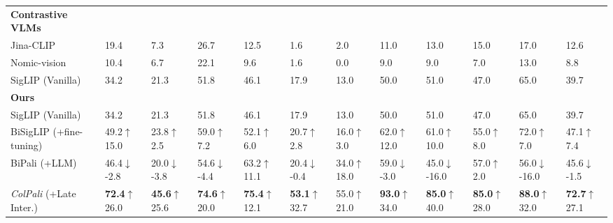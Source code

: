 \documentclass{article} %
\begin{document}
\begin{table}[ht]
{\begin{tabular}{ll@{\hskip 0.5em}l@{\hskip 0.5em}l@{\hskip 0.5em}l@{\hskip 0.5em}l@{\hskip 0.5em}l@{\hskip 0.5em}l@{\hskip 0.5em}l@{\hskip 0.5em}l@{\hskip 0.5em}l|@{\hskip 0.5em}l}
    \multicolumn{0}{l}{\textbf{Contrastive VLMs}}\\
    Jina-CLIP & 19.4 & 7.3 & 26.7 & 12.5 & 1.6 & 2.0 & 11.0 & 13.0 & 
    15.0 & 17.0 & 12.6\\
    Nomic-vision & 10.4 & 6.7 & 22.1 & 9.6 & 1.6 & 0.0 & 9.0 & 9.0 & 7.0 & 13.0 & 8.8\\
    SigLIP \tiny(Vanilla)& 34.2 & 21.3 & 51.8 & 46.1 & 17.9 & 13.0 & 50.0 & 51.0 & 47.0 & 65.0 & 39.7 \\
    
    \midrule
    \multicolumn{0}{l}{\textbf{Ours}}\\
    SigLIP \tiny(Vanilla)& 34.2 & 21.3 & 51.8 & 46.1 & 17.9 & 13.0 & 50.0 & 51.0 & 47.0 & 65.0 & 39.7 \\
    BiSigLIP \tiny (+fine-tuning) & 49.2\textcolor{green!75!black}{\tiny $\uparrow$15.0} & 23.8\textcolor{green!75!black}{\tiny $\uparrow$2.5} & 59.0\textcolor{green!75!black}{\tiny $\uparrow$7.2} & 52.1\textcolor{green!75!black}{\tiny $\uparrow$6.0} & 20.7\textcolor{green!75!black}{\tiny $\uparrow$2.8} & 16.0\textcolor{green!75!black}{\tiny $\uparrow$3.0} & 62.0\textcolor{green!75!black}{\tiny $\uparrow$12.0} & 61.0\textcolor{green!75!black}{\tiny $\uparrow$10.0} & 55.0\textcolor{green!75!black}{\tiny $\uparrow$8.0} & 72.0\textcolor{green!75!black}{\tiny $\uparrow$7.0} & 47.1\textcolor{green!75!black}{\tiny $\uparrow$7.4}\\
    BiPali \tiny (+LLM) & 46.4\textcolor{red!75!black}{\tiny $\downarrow$-2.8} & 20.0\textcolor{red!75!black}{\tiny $\downarrow$-3.8} & 54.6\textcolor{red!75!black}{\tiny $\downarrow$-4.4} & 63.2\textcolor{green!75!black}{\tiny $\uparrow$11.1} & 20.4\textcolor{red!75!black}{\tiny $\downarrow$-0.4} & 34.0\textcolor{green!75!black}{\tiny $\uparrow$18.0} & 59.0\textcolor{red!75!black}{\tiny $\downarrow$-3.0} & 45.0\textcolor{red!75!black}{\tiny $\downarrow$-16.0} & 57.0\textcolor{green!75!black}{\tiny $\uparrow$2.0} & 56.0\textcolor{red!75!black}{\tiny $\downarrow$-16.0} & 45.6\textcolor{red!75!black}{\tiny $\downarrow$-1.5}\\
    \textit{ColPali} \tiny (+Late Inter.) & \textbf{72.4}\textcolor{green!75!black}{\tiny $\uparrow$26.0} & \textbf{45.6}\textcolor{green!75!black}{\tiny $\uparrow$25.6} & \textbf{74.6}\textcolor{green!75!black}{\tiny $\uparrow$20.0} & \textbf{75.4}\textcolor{green!75!black}{\tiny $\uparrow$12.1} & \textbf{53.1}\textcolor{green!75!black}{\tiny $\uparrow$32.7} & 55.0\textcolor{green!75!black}{\tiny $\uparrow$21.0} & \textbf{93.0}\textcolor{green!75!black}{\tiny $\uparrow$34.0} & \textbf{85.0}\textcolor{green!75!black}{\tiny $\uparrow$40.0} & \textbf{85.0}\textcolor{green!75!black}{\tiny $\uparrow$28.0} & \textbf{88.0}\textcolor{green!75!black}{\tiny $\uparrow$32.0} & \textbf{72.7}\textcolor{green!75!black}{\tiny $\uparrow$27.1}\\
    \bottomrule
    \end{tabular}
    }
    


\end{table}
\end{document}
